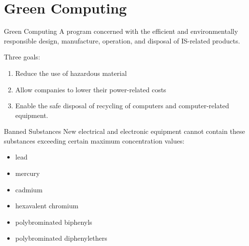 \documentclass[\main/notes.tex]{subfiles}
\begin{document}
		\section{Green Computing}
			\begin{definition}{Green Computing}
				A program concerned with the efficient and environmentally responsible design, manufacture, operation, and disposal of IS-related products.

				Three goals:
				\begin{enumerate}
					\item Reduce the use of hazardous material
					\item Allow companies to lower their power-related costs
					\item Enable the safe disposal of recycling of computers and computer-related equipment.
				\end{enumerate}
			\end{definition}
			\begin{sidenote}{Banned Substances}
				New electrical and electronic equipment cannot contain these substances exceeding certain maximum concentration values:
				\begin{multicols}{2}
					\begin{itemize}[nosep]
						\item lead
						\item mercury
						\item cadmium
						\item hexavalent chromium
						\item polybrominated biphenyls
						\item polybrominated diphenylethers
					\end{itemize}
				\end{multicols}
			\end{sidenote}
	\vbox{}
\end{document}

